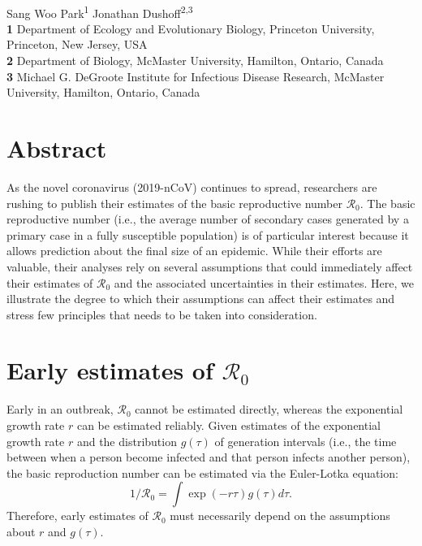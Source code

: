\documentclass[12pt]{article}
\date{\today}
\begin{document}
\begin{flushleft}{
	\Large
	\textbf{}
}
\newline
\\
Sang Woo Park\textsuperscript{1}
Jonathan Dushoff\textsuperscript{2,3}
\\

\bigskip
\textbf{1} Department of Ecology and Evolutionary Biology, Princeton University, Princeton, New Jersey, USA
\\
\textbf{2} Department of Biology, McMaster University, Hamilton, Ontario, Canada
\\
\textbf{3} Michael G. DeGroote Institute for Infectious Disease Research, McMaster University, Hamilton, Ontario, Canada
\\
\bigskip

\end{flushleft}

\section*{Abstract}

\pagebreak

As the novel coronavirus (2019-nCoV) continues to spread,
researchers are rushing to publish their estimates of the basic 
reproductive number $\mathcal R_0$.
The basic reproductive number (i.e., the 
average number of secondary cases generated 
by a primary case in a fully susceptible population) is of particular interest 
because it allows prediction about the final size of an epidemic.
While their efforts are valuable, their analyses rely on several
assumptions that could immediately affect their estimates of $\mathcal R_0$ and
the associated uncertainties in their estimates.
Here, we illustrate the degree to which their assumptions can affect
their estimates and stress few principles that needs to be taken into
consideration.

\section*{Early estimates of $\mathcal R_0$}

Early in an outbreak, $\mathcal R_0$ cannot be estimated directly,
whereas the exponential growth rate $r$ can be estimated reliably.
Given estimates of the exponential growth rate $r$ and the distribution $g(\tau)$ of 
generation intervals (i.e., the time between when a person become 
infected and that person infects another person), the basic reproduction
number can be estimated via the Euler-Lotka equation:
\begin{equation}
1/\mathcal R_0 = \int \exp(-r\tau) g(\tau) d\tau.
\end{equation}
Therefore, early estimates of $\mathcal R_0$ must 
necessarily depend on the assumptions about $r$ and $g(\tau)$.
\end{document}
